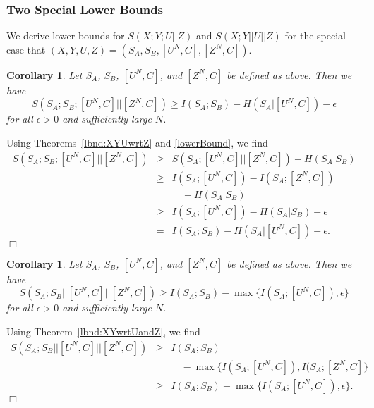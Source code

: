 \documentclass[a4paper, twoside, openany]{report}
\newcommand{\eps}{\epsilon}
\theoremstyle{plain}
\newtheorem{corollary}[theorem]{Corollary}
\theoremstyle{definition}
\newcommand{\proofend}{\hspace*{\fill} $\Box$\\}
\begin{document}

\subsubsection{Two Special Lower Bounds}

We derive lower bounds for $S(X;Y;U||Z)$ and $S(X;Y||U||Z)$ for the special case that $(X,Y,U,Z) = (S_A,S_B,[U^N,C],[Z^N,C])$.

\begin{corollary} \label{lbnd:SASBandUwrtZ}
Let $S_A$, $S_B$, $[U^N,C]$, and $[Z^N,C]$ be defined as above. Then we have
\[S(S_A;S_B;[U^N,C]||[Z^N,C]) \geq I(S_A;S_B) - H(S_A|[U^N,C]) - \eps\]
for all $\eps > 0$ and sufficiently large $N$.
\end{corollary}

\proof
Using Theorems~\ref{lbnd:XYUwrtZ} and \ref{lowerBound}, we find
\begin{eqnarray*}
S(S_A;S_B;[U^N,C]||[Z^N,C]) & \geq & S(S_A;[U^N,C]||[Z^N,C]) - H(S_A|S_B) \\
                            & \geq & I(S_A;[U^N,C]) - I(S_A;[Z^N,C]) \\
                            &      & \quad - H(S_A|S_B) \\
                            & \geq & I(S_A;[U^N,C]) - H(S_A|S_B) - \eps \\
                            &   =  & I(S_A;S_B) - H(S_A|[U^N,C]) - \eps.
\end{eqnarray*}
\proofend

\begin{corollary}  \label{lbnd:SASBwrtUandZ}
Let $S_A$, $S_B$, $[U^N,C]$, and $[Z^N,C]$ be defined as above. Then we have
\[S(S_A;S_B||[U^N,C]||[Z^N,C]) \geq I(S_A;S_B) -\max\{I(S_A;[U^N,C]), \eps\}\]
for all $\eps > 0$ and sufficiently large $N$.
\end{corollary}

\proof
Using Theorem~\ref{lbnd:XYwrtUandZ}, we find
\begin{eqnarray*}
S(S_A;S_B||[U^N,C]||[Z^N,C]) & \geq & I(S_A;S_B) \\
                             &      & \quad -\max\{I(S_A;[U^N,C]), I(S_A;[Z^N,C]\} \\
                             & \geq & I(S_A;S_B) -\max\{I(S_A;[U^N,C]), \eps\}.
\end{eqnarray*}
\proofend

\end{document}
